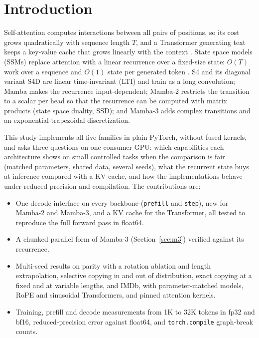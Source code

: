 \documentclass[conference]{IEEEtran}
\newcommand{\mamba}{Mamba}
\begin{document}
\section{Introduction}
Self-attention computes interactions between all pairs of positions, so its
cost grows quadratically with sequence length $T$, and a Transformer
generating text keeps a key-value cache that grows linearly with the
context \cite{vaswani2017attention}. State space models (SSMs) replace
attention with a linear recurrence over a fixed-size state: $O(T)$ work over
a sequence and $O(1)$ state per generated token
\cite{gu2021lssl,gu2022efficiently}. S4 and its diagonal variant S4D
\cite{gu2022s4d} are linear time-invariant (LTI) and train as a long
convolution; \mamba{} \cite{gu2023mamba} makes the recurrence
input-dependent; \mamba{}-2 \cite{dao2024transformers} restricts the
transition to a scalar per head so that the recurrence can be computed with
matrix products (state space duality, SSD); and \mamba{}-3
\cite{lahoti2026mamba3} adds complex transitions and an
exponential-trapezoidal discretization.

This study implements all five families in plain PyTorch, without fused
kernels, and asks three questions on one consumer GPU: which capabilities
each architecture shows on small controlled tasks when the comparison is
fair (matched parameters, shared data, several seeds), what the recurrent
state buys at inference compared with a KV cache, and how the
implementations behave under reduced precision and compilation. The
contributions are:

\begin{itemize}
\item One decode interface on every backbone (\texttt{prefill} and
\texttt{step}), new for \mamba{}-2 and \mamba{}-3, and a KV cache for the
Transformer, all tested to reproduce the full forward pass in float64.
\item A chunked parallel form of \mamba{}-3 (Section~\ref{sec:m3}) verified
against its recurrence.
\item Multi-seed results on parity with a rotation ablation and length
extrapolation, selective copying in and out of distribution, exact copying
at a fixed and at variable lengths, and IMDb, with parameter-matched models,
RoPE and sinusoidal Transformers, and pinned attention kernels.
\item Training, prefill and decode measurements from 1K to 32K tokens in
fp32 and bf16, reduced-precision error against float64, and
\texttt{torch.compile} graph-break counts.
\end{itemize}
\end{document}
